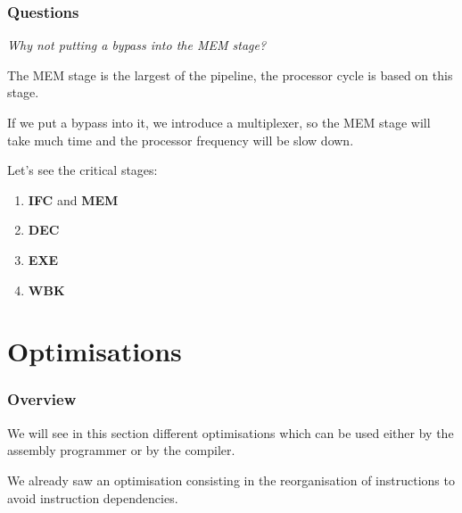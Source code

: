 \begin{frame}
  \frametitle{Questions}

  \textit{Why not putting a bypass into the MEM stage?}

  \nl

  The MEM stage is the largest of the pipeline, the processor cycle
  is based on this stage.

  \nl

  If we put a bypass into it, we introduce a multiplexer, so the MEM
  stage will take much time and the processor frequency will be slow down.

  \nl

  Let's see the critical stages:

  \begin{enumerate}
    \item
      \textbf{IFC} and \textbf{MEM}
    \item
      \textbf{DEC}
    \item
      \textbf{EXE}
    \item
      \textbf{WBK}
  \end{enumerate}
\end{frame}

%
%

\section{Optimisations}


\begin{frame}
  \frametitle{Overview}

  We will see in this section different optimisations which can be
  used either by the assembly programmer or by the compiler.

  \nl

  We already saw an optimisation consisting in the reorganisation
  of instructions to avoid instruction dependencies.
\end{frame}


